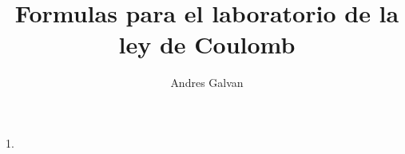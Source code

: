 \documentclass{article}
\title{Formulas para el laboratorio de la ley de Coulomb}
\author{Andres Galvan}
\begin{document}
\maketitle

1. 
\end{document}
